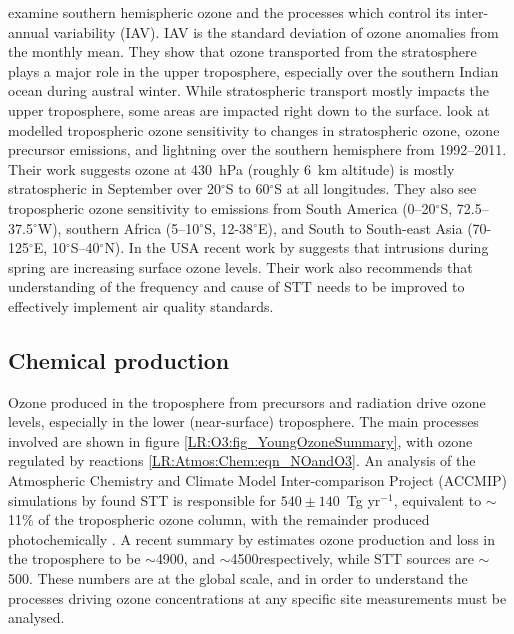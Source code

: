     \cite{Liu2017} examine southern hemispheric ozone and the processes which control its inter-annual variability (IAV).
    IAV is the standard deviation of ozone anomalies from the monthly mean.
    They show that ozone transported from the stratosphere plays a major role in the upper troposphere, especially over the southern Indian ocean during austral winter.
    While stratospheric transport mostly impacts the upper troposphere, some areas are impacted right down to the surface.
    \cite{Liu2017} look at modelled tropospheric ozone sensitivity to changes in stratospheric ozone, ozone precursor emissions, and lightning over the southern hemisphere from 1992--2011. 
    Their work suggests ozone at 430~hPa (roughly 6~km altitude) is mostly stratospheric in September over 20$^{\circ}$S to 60$^{\circ}$S at all longitudes.
    They also see tropospheric ozone sensitivity to emissions from South America (0--20$^{\circ}$S, 72.5--37.5$^{\circ}$W), southern Africa (5--10$^{\circ}$S, 12-38$^{\circ}$E), and South to South-east Asia (70-125$^{\circ}$E, 10$^{\circ}$S--40$^{\circ}$N).
    In the USA recent work by \cite{Lin2015} suggests that intrusions during spring are increasing surface ozone levels.
    Their work also recommends that understanding of the frequency and cause of STT needs to be improved to effectively implement air quality standards.
    
    
  \subsection{Chemical production}
    
    Ozone produced in the troposphere from precursors and radiation drive ozone levels, especially in the lower (near-surface) troposphere.
    The main processes involved are shown in figure \ref{LR:O3:fig_YoungOzoneSummary}, with ozone regulated by reactions \ref{LR:Atmos:Chem:eqn_NOandO3}.
    An analysis of the Atmospheric Chemistry and Climate Model Inter-comparison Project (ACCMIP) simulations by \cite{Young2013} found STT is responsible for $540\pm140$~Tg yr$^{-1}$, equivalent to $\sim$11\% of the tropospheric ozone column, with the remainder produced photochemically \citep{Monks2015}.
    A recent summary by \cite{Young2018} estimates ozone production and loss in the troposphere to be $\sim$4900\tgpyr, and $\sim$4500\tgpyr respectively, while STT sources are $\sim$500\tgpyr. 
    These numbers are at the global scale, and in order to understand the processes driving ozone concentrations at any specific site measurements must be analysed.
    
